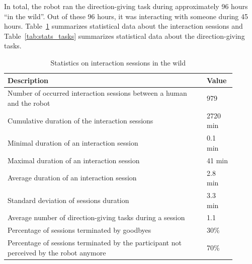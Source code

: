 \documentclass[a4paper,11pt,twoside]{StyleThese}
\begin{document}
In total, the robot ran the direction-giving task during approximately 96 hours ``in the wild''. Out of these 96 hours, it was interacting with someone during 45 hours. Table~\ref{tab:stats_sessions} summarizes statistical data about the interaction sessions and Table~\ref{tab:stats_tasks} summarizes statistical data about the direction-giving tasks.

\begin{table}[htp]
	\centering
	\begin{tabular}{p{0.8\linewidth}|p{0.1\linewidth}}
		\hline
		Description & Value \\ 
		\hline
		Number of occurred interaction sessions between a human and the robot &  979 \\ 
		Cumulative duration of the interaction sessions  & 2720 min \\ 
		Minimal duration of an interaction session  & 0.1 min \\ 
		Maximal duration of an interaction session & 41 min \\
		Average duration of an interaction session & 2.8 min \\
		Standard deviation of sessions duration & 3.3 min \\
		Average number of direction-giving tasks during a session & 1.1 \\
		Percentage of sessions terminated by goodbyes & 30\% \\
		Percentage of sessions terminated by the participant not perceived by the robot anymore & 70\% \\
		\hline
	\end{tabular}
	\caption{Statistics on interaction sessions in the wild}
	\label{tab:stats_sessions}
\end{table}
\end{document}
